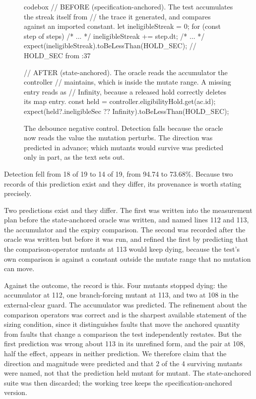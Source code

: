 \documentclass[12pt]{article}
\begin{document}
\begin{figure}[t]
\begin{tcblisting}{codebox}
// BEFORE (specification-anchored). The test accumulates the streak itself from
// the trace it generated, and compares against an imported constant.
let ineligibleStreak = 0;
for (const step of steps) { /* ... */ ineligibleStreak += step.dt; /* ... */ }
expect(ineligibleStreak).toBeLessThan(HOLD_SEC);          // HOLD_SEC from :37

// AFTER (state-anchored). The oracle reads the accumulator the controller
// maintains, which is inside the mutate range. A missing entry reads as
// Infinity, because a released hold correctly deletes its map entry.
const held = controller.eligibilityHold.get(ac.id);
expect(held?.ineligibleSec ?? Infinity).toBeLessThan(HOLD_SEC);
\end{tcblisting}
\caption{The debounce negative control. Detection falls because the oracle now
reads the value the mutation perturbs. The direction was predicted in advance;
which mutants would survive was predicted only in part, as the text sets out.}
\label{fig:debounce}
\end{figure}

Detection fell from 18 of 19 to 14 of 19, from 94.74 to 73.68\%. Because
two records of this prediction exist and they differ, its provenance is worth
stating precisely.

Two predictions exist and they differ. The first was written into the measurement
plan before the state-anchored oracle was written, and named lines 112 and 113,
the accumulator and the expiry comparison. The second was recorded after the
oracle was written but before it was run, and refined the first by predicting that
the comparison-operator mutants at 113 would keep dying, because the test's own
comparison is against a constant outside the mutate range that no mutation can
move.

Against the outcome, the record is this. Four mutants stopped dying: the
accumulator at 112, one branch-forcing mutant at 113, and two at 108 in the
external-clear guard. The accumulator was predicted. The refinement about the
comparison operators was correct and is the sharpest available statement of the
sizing condition, since it distinguishes faults that move the anchored quantity
from faults that change a comparison the test independently restates. But the
first prediction was wrong about 113 in its unrefined form, and the pair at 108,
half the effect, appears in neither prediction. We therefore claim that the
direction and magnitude were predicted and that 2 of the 4 surviving mutants
were named, not that the prediction held mutant for mutant. The state-anchored
suite was then discarded; the working tree keeps the specification-anchored
version.
\end{document}
